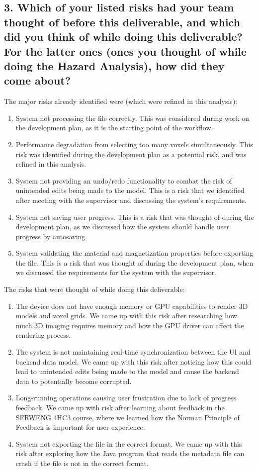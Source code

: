 \documentclass{article}
\begin{document}
\subsection*{3. Which of your listed risks had your team thought of before this
deliverable, and which did you think of while doing this deliverable? For
the latter ones (ones you thought of while doing the Hazard Analysis), how
did they come about?}
The major risks already identified were (which were refined in this analysis):
\begin{enumerate}
    \item System not processing the file correctly. This was considered during work on the development plan, as it is the starting point of the workflow.
    \item Performance degradation from selecting too many voxels simultaneously. This risk was identified during the development plan as a potential risk, and was refined in this analysis.
    \item System not providing an undo/redo functionality to combat the risk of unintended edits being made to the model. This is a risk that we identified after meeting with the supervisor and discussing the system's requirements.
    \item System not saving user progress. This is a risk that was thought of during the development plan, as we discussed how the system should handle user progress by autosaving.
    \item System validating the material and magnetization properties before exporting the file. This is a risk that was thought of during the development plan, when we discussed the requirements for the system with the supervisor.
\end{enumerate}
The risks that were thought of while doing this deliverable:
\begin{enumerate}
    \item The device does not have enough memory or GPU capabilities to render 3D models and voxel grids. We came up with this risk after researching how much 3D imaging requires memory and how the GPU driver can affect the rendering process.
    \item The system is not maintaining real-time synchronization between the UI and backend data model. We came up with this risk after noticing how this could lead to unintended edits being made to the model and cause the backend data to potentially become corrupted.
    \item Long-running operations causing user frustration due to lack of progress feedback. We came up with risk after learning about feedback in the SFRWENG 4HC3 course, where we learned how the Norman Principle of Feedback is important for user experience.
    \item System not exporting the file in the correct format. We came up with this risk after exploring how the Java program that reads the metadata file can crash if the file is not in the correct format.
\end{enumerate}
\end{document}
